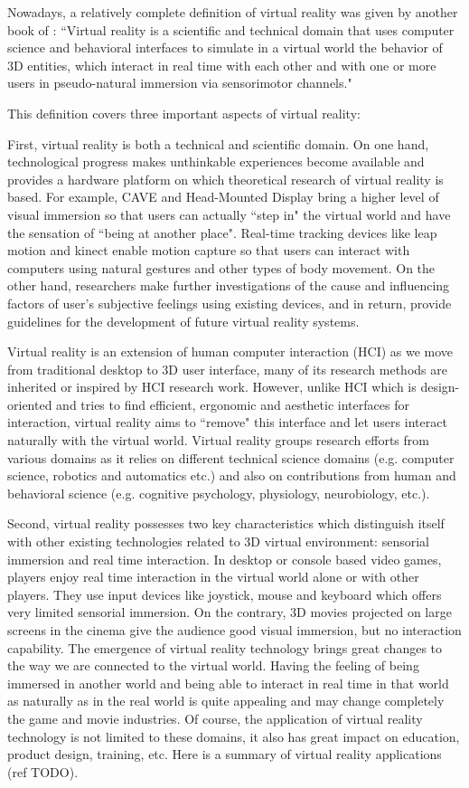 Nowadays, a relatively complete definition of virtual reality was given by another book of \citet{Fuchs2011Book}: ``Virtual reality is a scientific and technical domain that uses computer science and behavioral interfaces to simulate in a virtual world the behavior of 3D entities, which interact in real time with each other and with one or more users in pseudo-natural immersion via sensorimotor channels."

This definition covers three important aspects of virtual reality:

First, virtual reality is both a technical and scientific domain. On one hand, technological progress makes unthinkable experiences become available and provides a hardware platform on which theoretical research of virtual reality is based. For example, CAVE and Head-Mounted Display bring a higher level of visual immersion so that users can actually ``step in" the virtual world and have the sensation of ``being at another place". Real-time tracking devices like leap motion and kinect enable motion capture so that users can interact with computers using natural gestures and other types of body movement. On the other hand, researchers make further investigations of the cause and influencing factors of user's subjective feelings using existing devices, and in return, provide guidelines for the development of future virtual reality systems.

Virtual reality is an extension of human computer interaction (HCI) as we move from traditional desktop to 3D user interface, many of its research methods are inherited or inspired by HCI research work. However, unlike HCI which is design-oriented and tries to find efficient, ergonomic and aesthetic interfaces for interaction, virtual reality aims to ``remove" this interface and let users interact naturally with the virtual world. Virtual reality groups research efforts from various domains as it relies on different technical science domains (e.g. computer science, robotics and automatics etc.) and also on contributions from human and behavioral science (e.g. cognitive psychology, physiology, neurobiology, etc.).

Second, virtual reality possesses two key characteristics which distinguish itself with other existing technologies related to 3D virtual environment: sensorial immersion and real time interaction. In desktop or console based video games, players enjoy real time interaction in the virtual world alone or with other players. They use input devices like joystick, mouse and keyboard which offers very limited sensorial immersion. On the contrary, 3D movies projected on large screens in the cinema give the audience good visual immersion, but no interaction capability. The emergence of virtual reality technology brings great changes to the way we are connected to the virtual world. Having the feeling of being immersed in another world and being able to interact in real time in that world as naturally as in the real world is quite appealing and may change completely the game and movie industries. Of course, the application of virtual reality technology is not limited to these domains, it also has great impact on education, product design, training, etc. Here is a summary of virtual reality applications (ref TODO).

